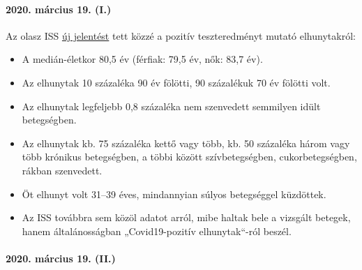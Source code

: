 \hypertarget{2020-muxe1rcius-19-i}{%
\paragraph{2020. március 19. (I.)}\label{2020-muxe1rcius-19-i}}

Az olasz ISS
\href{https://www.epicentro.iss.it/coronavirus/bollettino/Report-COVID-2019_17_marzo-v2.pdf}{új
jelentést} tett közzé a pozitív teszteredményt mutató elhunytakról:

\begin{itemize}
\tightlist
\item
  A medián-életkor 80,5 év (férfiak: 79,5 év, nők: 83,7 év).
\item
  Az elhunytak 10 százaléka 90 év fölötti, 90 százalékuk 70 év fölötti
  volt.
\item
  Az elhunytak legfeljebb 0,8 százaléka nem szenvedett semmilyen idült
  betegségben.
\item
  Az elhunytak kb. 75 százaléka kettő vagy több, kb. 50 százaléka három
  vagy több krónikus betegségben, a többi között szívbetegségben,
  cukorbetegségben, rákban szenvedett.
\item
  Öt elhunyt volt 31--39 éves, mindannyian súlyos betegséggel küzdöttek.
\item
  Az ISS továbbra sem közöl adatot arról, mibe haltak bele a vizsgált
  betegek, hanem általánosságban „Covid19-pozitív elhunytak``-ról
  beszél.
\end{itemize}

\hypertarget{2020-muxe1rcius-19-ii}{%
\paragraph{2020. március 19. (II.)}\label{2020-muxe1rcius-19-ii}}

